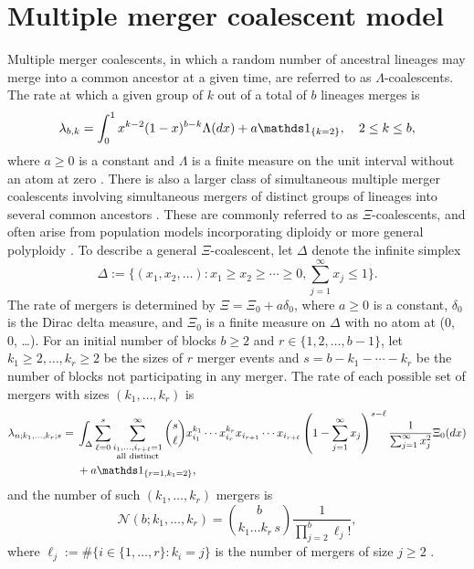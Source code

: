\documentclass{article}
\begin{document}
\label{app-multiple-mergers}
\section*{Multiple merger coalescent model}

Multiple merger coalescents, in which a random number of ancestral
lineages may merge into a common ancestor at a given time,
are referred to as $\Lambda$-coalescents.
The rate at which  a given group of $k$ out of a total of  $b$ lineages merges  is
\begin{equation}\label{lambdabk}
\lambda_{b, k} =  \int_0^1  x^{k-2}(1-x)^{b-k}\Lambda(dx) + a\one{k=2}, \quad 2 \le k \le b,
\end{equation}
where $a \geq 0$ is a constant and $\Lambda$ is a finite measure on the unit interval without an atom at zero \citep{DK99,P99,S99}.
There is also a larger class of simultaneous multiple merger coalescents involving
simultaneous mergers of distinct groups of lineages into several common ancestors \citep{S00}.
These are commonly referred to as $\Xi$-coalescents, and
often arise from population models incorporating diploidy or more general polyploidy
\citep{BBE13,blath2016site}.
To describe a general $\Xi$-coalescent, let $\Delta$ denote the
infinite simplex
\begin{equation*}
 \Delta := \Bigg\{ (x_1,x_2,  \ldots ): x_1 \ge x_2 \ge \cdots \ge 0, \sum_{j = 1}^{ \infty} x_j \le 1\Bigg\}.
 \end{equation*}
The rate of mergers is determined by
$\Xi = \Xi_0 + a\delta_0$, where $a \geq 0$ is a constant, $\delta_0$ is the Dirac delta
measure, and $\Xi_0$ is a finite measure on $\Delta$ with no atom at (0, 0, \ldots).
For an initial number of blocks $b \geq 2$ and
$r \in \{1,2, \ldots, b - 1 \}$, let $k_1 \geq 2, \ldots, k_r \ge 2$ be the sizes of $r$ merger events
and $s = b - k_1 - \cdots - k_r$ be the number of blocks not participating in any merger.
The rate of each possible set of mergers with sizes $(k_1, \ldots, k_r)$ is
\begin{align*}
  \lambda_{n; k_1, \ldots, k_r; s}  = {}& \int_\Delta  \sum_{\ell = 0}^s \sum_{\substack {i_1, \ldots, i_{r+\ell} = 1\\ \text{all distinct}} }^\infty  \binom{s}{\ell} x_{i_1}^{k_1} \cdots  x
_{i_{r}}^{k_r} x_{i_{r+1}} \cdots x_{i_{r+\ell}}\left(1 - \sum_{j=1}^\infty x_j \right)^{s-\ell} \frac{1}{ \sum_{j=1}^\infty x_j^2 } \Xi_0(dx)   \\
  & +  a\one{r=1, k_1 = 2},
\end{align*}
and the number of such $(k_1, \ldots, k_r)$ mergers is
\begin{equation*}
    \mathcal{N}(b; k_1, \ldots, k_r ) = \binom{b}{k_1 \ldots k_r\, s} \frac{1}{ \prod_{j=2}^b\ell_j!  },
\end{equation*}
where $\ell_j := \#\{ i \in \{ 1, \ldots, r \} : k_i = j \}$ is the number of mergers of size $j \geq 2$ \citep{S00}.
\end{document}
